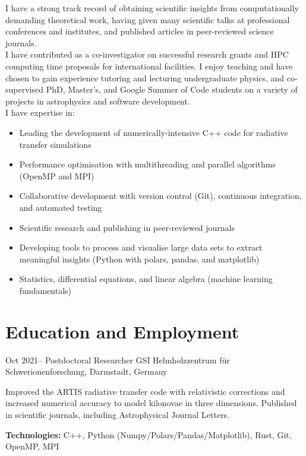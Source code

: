 \documentclass[11pt]{article} %
\begin{document}
I have a strong track record of obtaining scientific insights from computationally demanding theoretical work, having given many scientific talks at professional conferences and institutes, and published articles in peer-reviewed science journals.\\

I have contributed as a co-investigator on successful research grants and HPC computing time proposals for international facilities. I enjoy teaching and have chosen to gain experience tutoring and lecturing undergraduate physics, and co-supervised PhD, Master's, and Google Summer of Code students on a variety of projects in astrophysics and software development.\\
%


I have expertise in:
\begin{itemize}
  \item Leading the development of numerically-intensive C++ code for radiative transfer simulations
  \item Performance optimisation with multithreading and parallel algorithms (OpenMP and MPI)
  \item Collaborative development with version control (Git), continuous integration, and automated testing
  \item Scientific research and publishing in peer-reviewed journals
  \item Developing tools to process and visualise large data sets to extract meaningful insights (Python with polars, pandas, and matplotlib)
  \item Statistics, differential equations, and linear algebra (machine learning fundamentals)
\end{itemize}



\section{Education and Employment}

\job
{Oct 2021--}{}
{Postdoctoral Researcher}
{}
{GSI Helmholzzentrum für Schwerionenforschung, Darmstadt, Germany}
{\begin{itemize-noindent}
\item{Improved the ARTIS radiative transfer code with relativistic corrections and increased numerical accuracy to model kilonovae in three dimensions. Published in scientific journals, including Astrophysical Journal Letters.}
\end{itemize-noindent}
\textbf{Technologies:} C++, Python (Numpy/Polars/Pandas/Matplotlib), Rust, Git, OpenMP, MPI\\
}
\end{document}
